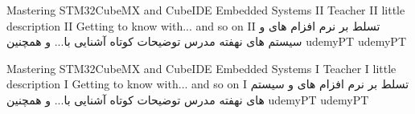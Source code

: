 
\professionalTrainingCI
{Mastering STM32CubeMX and CubeIDE Embedded Systems II}
{Teacher II}
{little description II}
{Getting to know with... and so on II}
{تسلط بر نرم افزام های  و  سیستم های نهفته }
{مدرس }
{توضیحات کوتاه }
{آشنایی با... و همچنین }
{udemyPT}
\professionalTrainingCII
{}
{}
{}
{udemyPT}

\professionalTrainingCI
{Mastering STM32CubeMX and CubeIDE Embedded Systems I}
{Teacher I}
{little description I}
{Getting to know with... and so on I}
{تسلط بر نرم افزام های  و  سیستم های نهفته }
{مدرس }
{توضیحات کوتاه }
{آشنایی با... و همچنین }
{udemyPT}
\professionalTrainingCII
{}
{}
{}
{udemyPT}

